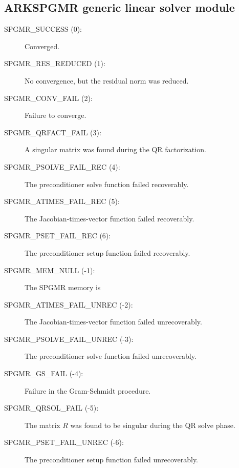 \documentclass[letterpaper,10pt,english]{sphinxmanual}
\begin{document}
\subsection{ARKSPGMR generic linear solver module}
\label{Constants:arkspgmr-generic-linear-solver-module}\begin{description}
\item[{SPGMR\_SUCCESS  (0):}] \leavevmode
Converged.

\item[{SPGMR\_RES\_REDUCED  (1):}] \leavevmode
No convergence, but the residual norm was
reduced.

\item[{SPGMR\_CONV\_FAIL  (2):}] \leavevmode
Failure to converge.

\item[{SPGMR\_QRFACT\_FAIL  (3):}] \leavevmode
A singular matrix was found during the
QR factorization.

\item[{SPGMR\_PSOLVE\_FAIL\_REC  (4):}] \leavevmode
The preconditioner solve function
failed recoverably.

\item[{SPGMR\_ATIMES\_FAIL\_REC  (5):}] \leavevmode
The Jacobian-times-vector function
failed recoverably.

\item[{SPGMR\_PSET\_FAIL\_REC  (6):}] \leavevmode
The preconditioner setup function failed
recoverably.

\item[{SPGMR\_MEM\_NULL  (-1):}] \leavevmode
The SPGMR memory is 

\item[{SPGMR\_ATIMES\_FAIL\_UNREC  (-2):}] \leavevmode
The Jacobian-times-vector function
failed unrecoverably.

\item[{SPGMR\_PSOLVE\_FAIL\_UNREC  (-3):}] \leavevmode
The preconditioner solve function
failed unrecoverably.

\item[{SPGMR\_GS\_FAIL  (-4):}] \leavevmode
Failure in the Gram-Schmidt procedure.

\item[{SPGMR\_QRSOL\_FAIL  (-5):}] \leavevmode
The matrix $R$ was found to be
singular during the QR solve phase.

\item[{SPGMR\_PSET\_FAIL\_UNREC  (-6):}] \leavevmode
The preconditioner setup function
failed unrecoverably.

\end{description}
\end{document}
